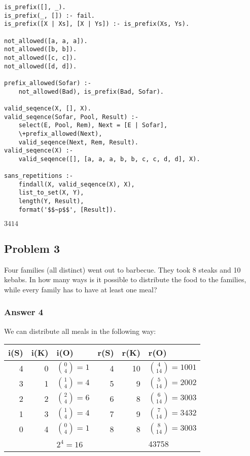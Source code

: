 \documentclass[11pt]{article}
\begin{document}
\lstset{language=prolog,label= ,caption= ,captionpos=b,numbers=none}
\begin{lstlisting}
is_prefix([], _).
is_prefix(_, []) :- fail.
is_prefix([X | Xs], [X | Ys]) :- is_prefix(Xs, Ys).

not_allowed([a, a, a]).
not_allowed([b, b]).
not_allowed([c, c]).
not_allowed([d, d]).

prefix_allowed(Sofar) :-
    not_allowed(Bad), is_prefix(Bad, Sofar).

valid_seqence(X, [], X).
valid_seqence(Sofar, Pool, Result) :-
    select(E, Pool, Rem), Next = [E | Sofar],
    \+prefix_allowed(Next),
    valid_seqence(Next, Rem, Result).
valid_seqence(X) :-
    valid_seqence([], [a, a, a, b, b, c, c, d, d], X).

sans_repetitions :-
    findall(X, valid_seqence(X), X),
    list_to_set(X, Y),
    length(Y, Result),
    format('$$~p$$', [Result]).
\end{lstlisting}

\(3414\)

\subsection{Problem 3}
\label{sec:orgheadline7}
Four families (all distinct) went out to barbecue.  They took 8 steaks and 10
kebabs.  In how many ways is it possible to distribute the food to the
families, while every family has to have at least one meal?

\subsubsection{Answer 4}
\label{sec:orgheadline6}
We can distribute all meals in the following way:

\begin{center}
\begin{tabular}{rrlrrl}
i(S) & i(K) & i(O) & r(S) & r(K) & r(O)\\
\hline
4 & 0 & \({0\choose 4}=1\) & 4 & 10 & \({4\choose 14}=1001\)\\
3 & 1 & \({1\choose 4}=4\) & 5 & 9 & \({5\choose 14}=2002\)\\
2 & 2 & \({2\choose 4}=6\) & 6 & 8 & \({6\choose 14}=3003\)\\
1 & 3 & \({1\choose 4}=4\) & 7 & 9 & \({7\choose 14}=3432\)\\
0 & 4 & \({0\choose 4}=1\) & 8 & 8 & \({8\choose 14}=3003\)\\
\hline
 &  & \(2^4=16\) &  &  & 43758\\
\end{tabular}
\end{center}
\end{document}
